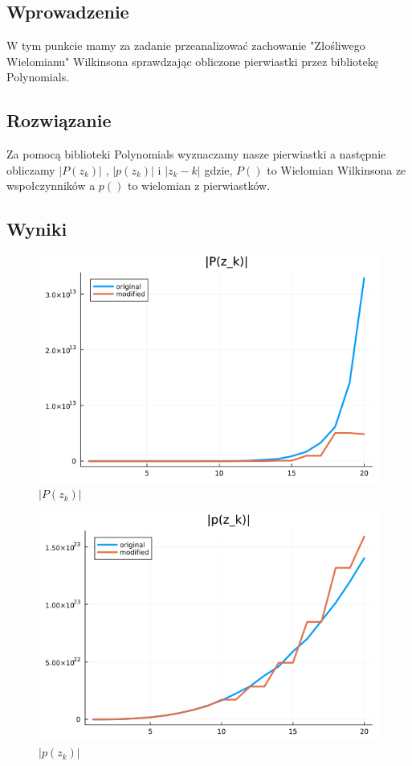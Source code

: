 \documentclass{article}
\begin{document}
    \subsection{Wprowadzenie}
    W tym punkcie mamy za zadanie przeanalizować zachowanie "Złośliwego Wielomianu" Wilkinsona sprawdzając obliczone pierwiastki przez bibliotekę Polynomials.
    \subsection{Rozwiązanie}
    Za pomocą biblioteki Polynomials wyznaczamy nasze pierwiastki a następnie obliczamy $|P(z_k)|$ , $|p(z_k)|$ i $|z_k - k|$ gdzie, $P()$ to Wielomian Wilkinsona ze wspołczynników a $p()$ to wielomian z pierwiastków.
    \subsection{Wyniki}
    \begin{figure}[H]
        \centering
        \includegraphics[width=0.75\linewidth]{4.1.png}
        \caption{$|P(z_k)|$}
        \label{fig:enter-label}
    \end{figure}
    \begin{figure}[H]
        \centering
        \includegraphics[width=0.75\linewidth]{4.2.png}
        \caption{$|p(z_k)|$}
        \label{fig:enter-label}
    \end{figure}
\end{document}
